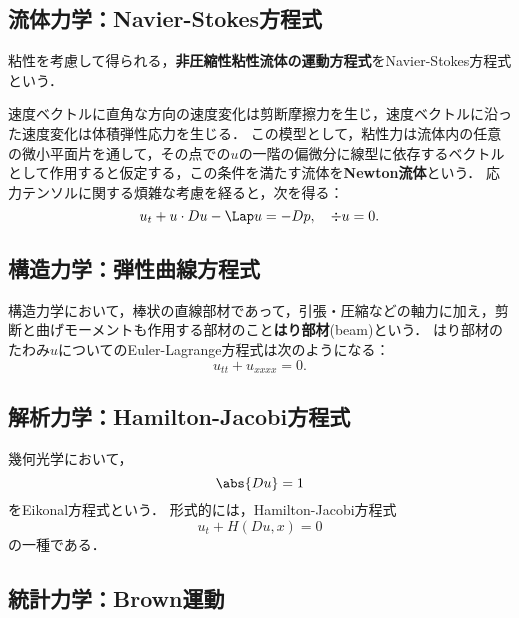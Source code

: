 \documentclass[uplatex,dvipdfmx]{jsreport}
\begin{document}
\subsection{流体力学：Navier-Stokes方程式}

\begin{tcolorbox}[colframe=ForestGreen, colback=ForestGreen!10!white,breakable,colbacktitle=ForestGreen!40!white,coltitle=black,fonttitle=\bfseries\sffamily,
title=非圧縮性粘性流体]
    粘性を考慮して得られる，\textbf{非圧縮性粘性流体の運動方程式}をNavier-Stokes方程式という．
\end{tcolorbox}

\begin{model}
    速度ベクトルに直角な方向の速度変化は剪断摩擦力を生じ，速度ベクトルに沿った速度変化は体積弾性応力を生じる．
    この模型として，粘性力は流体内の任意の微小平面片を通して，その点での$u$の一階の偏微分に線型に依存するベクトルとして作用すると仮定する，この条件を満たす流体を\textbf{Newton流体}という．
    応力テンソルに関する煩雑な考慮を経ると，次を得る：
    \[u_t+u\cdot Du-\Lap u=-Dp,\quad\div u=0.\]
\end{model}

\subsection{構造力学：弾性曲線方程式}

\begin{model}
    構造力学において，棒状の直線部材であって，引張・圧縮などの軸力に加え，剪断と曲げモーメントも作用する部材のこと\textbf{はり部材}(beam)という．
    はり部材のたわみ$u$についてのEuler-Lagrange方程式は次のようになる：
    \[u_{tt}+u_{xxxx}=0.\]
\end{model}

\subsection{解析力学：Hamilton-Jacobi方程式}

\begin{model}
    幾何光学において，
    \[\abs{Du}=1\]
    をEikonal方程式という．
    形式的には，Hamilton-Jacobi方程式
    \[u_t+H(Du,x)=0\]
    の一種である．
\end{model}

\subsection{統計力学：Brown運動}
\end{document}
